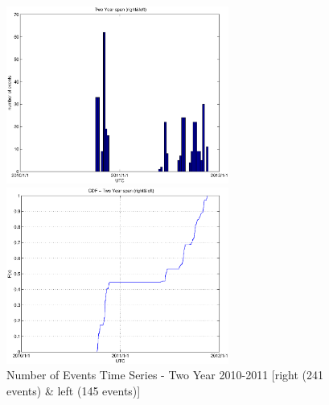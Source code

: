 \documentclass[a4paper,11pt]{article}
\begin{document}
\begin{figure}[htbp]
\begin{minipage}{0.55\hsize}
\centering
\includegraphics[width=7.3cm, clip]{histTime2y.eps}
\end{minipage}
\begin{minipage}{0.55\hsize}
 \centering
\includegraphics[width=7.3cm, clip]{CDFTime2y.eps}
\end{minipage}
\caption{Number of Events Time Series - Two Year 2010-2011 [right (241 events) \& left (145 events)] }
\end{figure}

\newpage
\end{document}
